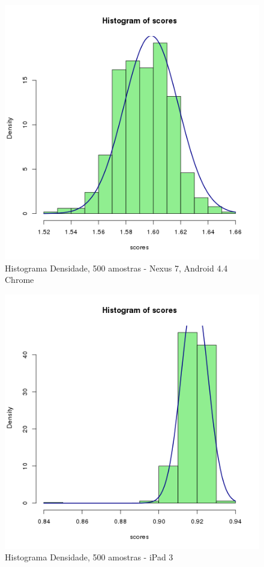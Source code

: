 \documentclass[11pt,a4paper]{article}
\begin{document}
\begin{figure}[H]
    \caption{Histograma Densidade, 500 amostras - Nexus 7, Android 4.4 Chrome}
    \label{nexus44histogramadensidade}
    \centering
    \includegraphics[width=\textwidth]{images/hist-density-n7-a44-chrome-500-amostras-20131119}
\end{figure}

\begin{figure}[H]
    \caption{Histograma Densidade, 500 amostras - iPad 3}
    \label{ipadhistogramadensidade}
    \centering
    \includegraphics[width=\textwidth]{images/hist-density-ipad-3-ios7-safari-500-amostras-20131119}
\end{figure}
\end{document}
